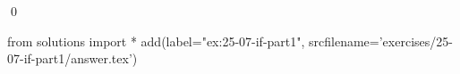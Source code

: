 
\begin{ex}
  \label{ex:25-07-if-part1}
  
  \qed
\end{ex}
\begin{python0}
from solutions import *
add(label="ex:25-07-if-part1",
    srcfilename='exercises/25-07-if-part1/answer.tex')
\end{python0}
